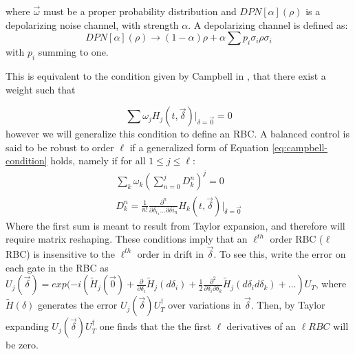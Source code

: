 \documentclass[aps,nofootinbib,pra,notitlepage,twocolumn]{revtex4-1}
\begin{document}
where $\vec{\omega}$ must be a proper probability distribution and $DPN[\alpha](\rho)$ is a depolarizing noise channel, with strength $\alpha$. A depolarizing channel is defined as:
\begin{equation}\label{eq:2}
  DPN[\alpha](\rho) \rightarrow (1-\alpha)\rho + \alpha\sum p_i \sigma_i\rho\sigma_i
\end{equation}
with $p_i$ summing to one.

This is equivalent to the condition given by Campbell in \cite{Campbell2017}, that there exist a weight such that

\begin{equation}\label{eq:campbell-condition}
\sum \omega_j H_j(t, \vec{\delta})|_{\delta=\vec{0}} = 0
\end{equation}
however we will generalize this condition to define an RBC. A balanced control is said to be robust to order $\ell$ if a generalized form of Equation \ref{eq:campbell-condition} holds, namely if for all $1 \leq j \leq \ell$:
\begin{equation}\label{eq:RBC}
\begin{gathered}
\sum_k\omega_k(\sum_{n=0}^j D^n_k)^j = 0\\
D^n_k = \frac{1}{n!}\frac{\partial^{n}}{\partial\delta_{i_1}...\partial\delta{i_n}}H_k(t,\vec{\delta})|_{\delta=\vec{0}}
\end{gathered}
\end{equation}
Where the first sum is meant to result from Taylor expansion, and therefore will require matrix reshaping. These conditions imply that an $\ell^{th}$ order RBC ($\ell$RBC) is insensitive to the $\ell^{th}$ order in drift in $\vec{\delta}$. To see this, write the error on each gate in the RBC as $U_j(\vec{\delta}) = exp(-i(\tilde{H}_j(\vec{0}) + \frac{\partial}{\partial\delta_i}\tilde{H}_j(d\delta_i) +  \frac{1}{2}\frac{\partial^2}{\partial\delta_i\partial\delta_k} \tilde{H}_j(d\delta_i d\delta_k) + ...)U_T$, where $\tilde{H}(\delta)$ generates the error $U_j(\vec{\delta})U_T^{\dagger}$ over variations in $\vec{\delta}$. Then, by Taylor expanding $U_j(\vec{\delta})U_T^{\dagger}$ one finds that the the first $\ell$ derivatives of an $\ell RBC$ will be zero.
\end{document}
